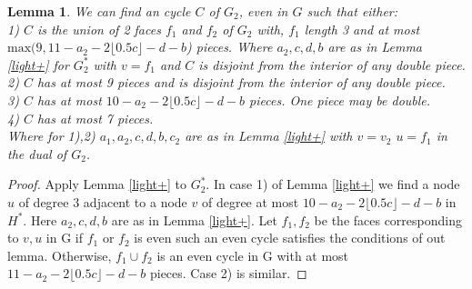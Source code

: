 \documentclass{article}
\newcommand{\0}{\mathbb{0}}
\newcommand{\1}{\mathbb{1}}
\newtheorem{lemma}[theorem]{Lemma}
\begin{document}
%
\begin{lemma}\label{even reduced+}
We can find an  cycle $C$ of $G_2$, even in $G$ such that either: \\
1)  $C$ is the union of 2 faces $f_1$ and $f_2$ of $G_2$ with, $f_1$ length 3 and at most  $ \text{max} ( 9, 11- a_2 -2 \lfloor 0.5 c \rfloor -d  -b $) pieces.   Where $ a_2, c ,d ,b $ are as in Lemma \ref{light+}  for $G_2^*$ with $v=f_1$  and $C$ is disjoint from the interior of any double piece. \\ 
2) $C$ has at most 9 pieces and is disjoint from the interior of any double piece. \\
3) $C$ has at most $10- a_2 -2 \lfloor 0.5 c \rfloor -d  -b $  pieces. One piece may be double. \\
4) $C$ has at most 7 pieces. \\
Where for 1),2) $a_1,a_2, c, d, b ,c_2$ are as in Lemma \ref{light+} with  $ v=v_2$  $u=f_1$ in the dual of $G_2$.
\end{lemma}
\begin{proof}
 Apply Lemma \ref{light+} to $G_2^*$.  In case 1) of Lemma \ref{light+}  we find a node $u$ of degree 3 adjacent to a node $v$ of degree at most $10-a_2-2\lfloor 0.5 c \rfloor -d -b$  in $H^*$. Here $a_2,c,d,b$ are as in Lemma \ref{light+}. Let $f_1 , f_2$ be the faces corresponding to $v,u$ in G if $f_1$ or $f_2$ is even such an even cycle satisfies the conditions of out lemma. Otherwise, $f_1 \cup f_2$ is an even cycle in G with at most  $11- a_2 -2 \lfloor 0.5 c \rfloor -d  -b $ pieces. Case 2) is similar.
\end{proof}
\end{document}
